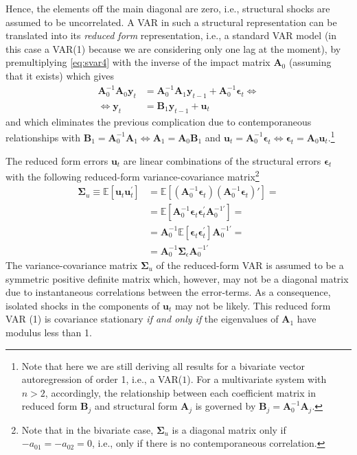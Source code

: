 \documentclass[a4paper,11pt,listof=nochaptergap,oneside,pointednumbers,bibtotoc,bigheadings,liststotoc,hidelinks]{scrbook}
\theoremstyle{mysatz}
\theoremstyle{mydefinition}
\theoremstyle{mytheorem}
\theoremstyle{mybemerkung}
\newcommand{\vect}[1]{\boldsymbol{\mathbf{#1}}}
\begin{document}
Hence, the elements off the main diagonal are zero, i.e., structural shocks are assumed to be uncorrelated. A VAR in such a structural representation can be translated into its \textit{reduced form} representation, i.e., a standard VAR model (in this case a VAR(1) because we are considering only one lag at the moment), by premultiplying \ref{eq:svar4} with the inverse of the impact matrix $\vect{A}_0$ (assuming that it exists) which gives
\begin{equation} \label{eq:svar5}
\begin{split}
	          \vect{A}_0^{-1}\vect{A}_0\vect{y}_t & = \vect{A}_0^{-1}\vect{A}_1\vect{y}_{t-1} + \vect{A}_0^{-1}\vect{\epsilon}_t     \iff \\
	\iff 						\vect{y}_t & = \vect{B}_1\vect{y}_{t-1} + \vect{u}_t
\end{split}								
\end{equation}
and which eliminates the previous complication due to contemporaneous relationships with $\vect{B}_1 = \vect{A}_0^{-1}\vect{A}_1 \iff \vect{A}_1 = \vect{A}_0\vect{B}_1$ and $\vect{u}_t = \vect{A}_0^{-1}\vect{\epsilon}_t \iff \vect{\epsilon}_t = \vect{A}_0\vect{u}_t$.\footnote{Note that here we are still deriving all results for a bivariate vector autoregression of order 1, i.e., a VAR($1$). For a multivariate system with $n>2$, accordingly, the relationship between each coefficient matrix in reduced form $\vect{B}_j$ and structural form $\vect{A}_j$ is governed by $\vect{B}_j = \vect{A}_0^{-1}\vect{A}_j$.}

The reduced form errors $\vect{u}_t$ are linear combinations of the structural errors $\vect{\epsilon}_t$ \citep{zivot:00} with the following reduced-form variance-covariance matrix\footnote{Note that in the bivariate case, $\vect{\Sigma}_u$ is a diagonal matrix only if $-a_{01} = -a_{02} = 0$, i.e., only if there is no contemporaneous correlation.}
\begin{equation} \label{eq:svar6}
\begin{split}
 		\vect{\Sigma}_u \equiv \mathbb{E}[\vect{u}_t\vect{u}_t^'] & = \mathbb{E}[(\vect{A}_0^{-1}\vect{\epsilon}_t) (\vect{A}_0^{-1}\vect{\epsilon}_t)' ] = \\
		& = \mathbb{E}[\vect{A}_0^{-1}\vect{\epsilon}_t \vect{\epsilon}_t^'\vect{A}_0^{-1'}] = \\
		& = \vect{A}_0^{-1}\mathbb{E}[\vect{\epsilon}_t \vect{\epsilon}_t^']\vect{A}_0^{-1'} = \\
		& = \vect{A}_0^{-1}\vect{\Sigma}_\epsilon\vect{A}_0^{-1'}
\end{split}								
\end{equation}
The variance-covariance matrix $\vect{\Sigma}_u$ of the reduced-form VAR is assumed to be a symmetric positive definite matrix which, however, may not be a diagonal matrix due to instantaneous correlations between the error-terms. As a consequence, isolated shocks in the components of $\vect{u}_t$ may not be likely. This reduced form VAR (1) is covariance stationary \textit{if and only if} the eigenvalues of $\vect{A}_1$ have modulus less than 1.
\end{document}
